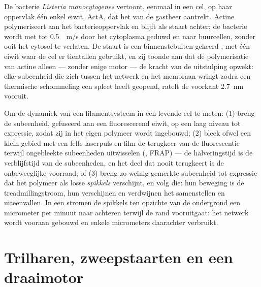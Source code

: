 \begin{example}\label{ex:b3:cytoskeleton-motility:listeria}
De bacterie \emph{Listeria monocytogenes} vertoont, eenmaal in een cel,
op haar oppervlak één enkel eiwit, ActA, dat het  van de
gastheer aantrekt. Actine polymeriseert aan het bacterieoppervlak en
blijft als staart achter; de bacterie wordt met tot \qty{0.5}{\micro
m/s} door het cytoplasma geduwd en naar buurcellen, zonder ooit het
cytosol te verlaten. De staart is een binnenstebuiten gekeerd
, met één eiwit waar de cel er tientallen gebruikt, en zij
toonde aan dat de polymerisatie van actine alleen --- zonder enige
motor --- de kracht van de uitstulping opwekt: elke subeenheid die zich
tussen het netwerk en het membraan wringt zodra een thermische
schommeling een spleet heeft geopend, ratelt de voorkant \qty{2.7}{nm}
vooruit.
\end{example}

\begin{method}\label{met:b3:cytoskeleton-motility:frap}
Om de dynamiek van een filamentsysteem in een levende cel te meten: (1)
breng de subeenheid, gefuseerd aan een fluorescerend eiwit, op een laag
niveau tot expressie, zodat zij in het eigen polymeer wordt ingebouwd;
(2) bleek ofwel een klein gebied met een felle laserpuls en film de
terugkeer van de fluorescentie terwijl ongebleekte subeenheden
uitwisselen (\emph{}, FRAP) --- de
halveringstijd is de verblijfstijd van de subeenheden, en het deel dat
nooit terugkeert is de onbeweeglijke voorraad; of (3) breng zo weinig
gemerkte subeenheid tot expressie dat het polymeer als losse
\emph{spikkels} verschijnt, en volg die: hun beweging is de
treadmillingstroom, hun verschijnen en verdwijnen het samenstellen en
uiteenvallen. In een  stromen de spikkels ten opzichte van
de ondergrond een micrometer per minuut naar achteren terwijl de rand
vooruitgaat: het netwerk wordt vooraan gebouwd en enkele micrometers
daarachter verbruikt.
\end{method}

\section{Trilharen, zweepstaarten en een draaimotor}

